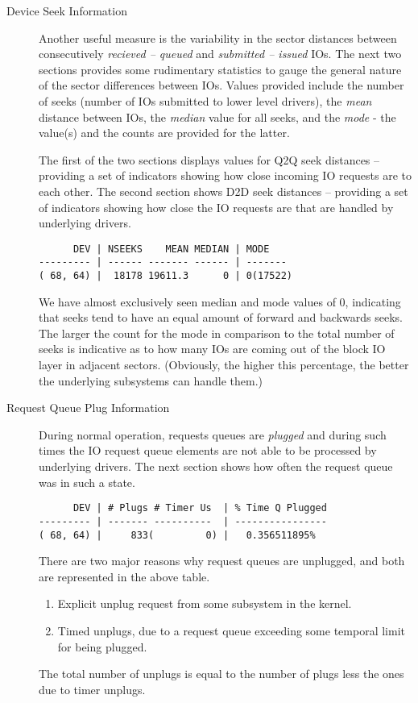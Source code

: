 \documentclass{article}
\begin{document}
\begin{description}
  \item[Device Seek Information]

  Another useful measure is the variability in the sector distances
  between consecutively \emph{recieved -- queued} and \emph{submitted
  -- issued} IOs. The next two sections provides some rudimentary
  statistics to gauge the general nature of the sector differences
  between IOs. Values provided include the number of seeks (number of IOs
  submitted to lower level drivers), the \emph{mean} distance between
  IOs, the \emph{median} value for all seeks, and the \emph{mode} -
  the value(s) and the counts are provided for the latter.

  The first of the two sections displays values for Q2Q seek distances --
  providing a set of indicators showing how close incoming IO requests
  are to each other. The second section shows D2D seek distances --
  providing a set of indicators showing how close the IO requests are
  that are handled by underlying drivers.

\begin{verbatim}
      DEV | NSEEKS    MEAN MEDIAN | MODE
--------- | ------ ------- ------ | -------
( 68, 64) |  18178 19611.3      0 | 0(17522)
\end{verbatim}

  We have almost exclusively seen median and mode values of 0, indicating
  that seeks tend to have an equal amount of forward and backwards
  seeks. The larger the count for the mode in comparison to the total
  number of seeks is indicative as to how many IOs are coming out of
  the block IO layer in adjacent sectors. (Obviously, the higher this
  percentage, the better the underlying subsystems can handle them.)

  \item[Request Queue Plug Information]

  During normal operation, requests queues are \emph{plugged} and during
  such times the IO request queue elements are not able to be processed
  by underlying drivers. The next section shows how often the request
  queue was in such a state.

\begin{verbatim}
      DEV | # Plugs # Timer Us  | % Time Q Plugged
--------- | ------- ----------  | ----------------
( 68, 64) |     833(         0) |   0.356511895%
\end{verbatim}

  There are two major reasons why request queues are unplugged, and both
  are represented in the above table.

  \begin{enumerate}
    \item Explicit unplug request from some subsystem in the kernel.

    \item Timed unplugs, due to a request queue exceeding some temporal
    limit for being plugged. 
  \end{enumerate}

  The total number of unplugs is equal to the number of plugs less the
  ones due to timer unplugs.
\end{description}
\end{document}
